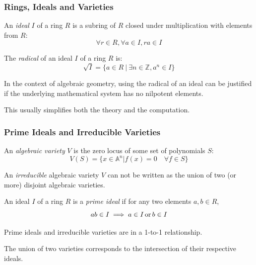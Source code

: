 \documentclass{beamer}
\begin{document}
\begin{frame}
\frametitle{Rings, Ideals and Varieties}

\begin{definition}
An {\it ideal} $I$ of a ring $R$ is a subring of $R$ closed under multiplication with elements from $R$:
\[ \forall r \in R, \forall a \in I, ra \in I \]
\end{definition}

\begin{definition}
The {\it radical} of an ideal $I$ of a ring $R$ is:
\[ \sqrt{I} = \{ a \in R \ | \ \exists n \in {\mathbb Z}, a^n \in I \} \]
\end{definition}

In the context of algebraic geometry, using the radical of an ideal can be justified if the underlying
mathematical system has no nilpotent elements.

\vskip 12pt

This usually
simplifies both the theory and the computation.

\end{frame}

\begin{frame}
\frametitle{Prime Ideals and Irreducible Varieties}

\begin{definition}
An {\it algebraic variety} $V$ is the zero locus of some set of polynomials $S$:
\[ V(S) = \{ x \in {\mathbb A}^n | f(x) = 0 \quad\forall f \in S \} \]
\end{definition}

\begin{definition}
An {\it irreducible} algebraic variety $V$ can not be written as the
union of two (or more) disjoint algebraic varieties.
\end{definition}

\begin{definition}
An ideal $I$ of a ring $R$ is a {\it prime ideal} if
for any two elements $a,b \in R$,
\[ ab \in I \implies a \in I {\rm\, or\,} b \in I \]
\end{definition}

Prime ideals and irreducible varieties are in a 1-to-1 relationship.


The union of two varieties corresponds to the intersection of their respective ideals.

\end{frame}
\end{document}
